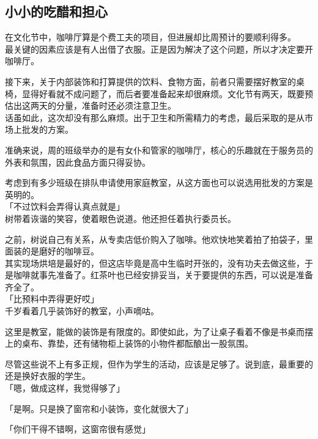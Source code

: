 \subsection{小小的吃醋和担心}

在文化节中，咖啡厅算是个费工夫的项目，但进展却比周预计的要顺利得多。\\

最关键的因素应该是有人出借了衣服。正是因为解决了这个问题，所以才决定要开咖啡厅。

接下来，关于内部装饰和打算提供的饮料、食物方面，前者只需要摆好教室的桌椅，显得好看就不成问题了，而后者要准备起来却很麻烦。文化节有两天，既要预估出这两天的分量，准备时还必须注意卫生。\\

话虽如此，这次却没有那么麻烦。出于卫生和所需精力的考虑，最后采取的是从市场上批发的方案。

准确来说，周的班级举办的是有女仆和管家的咖啡厅，核心的乐趣就在于服务员的外表和氛围，因此食品方面只得妥协。

考虑到有多少班级在排队申请使用家庭教室，从这方面也可以说选用批发的方案是英明的。\\

「不过饮料会弄得认真点就是」\\

树带着诙谐的笑容，使着眼色说道。他还担任着执行委员长。

之前，树说自己有关系，从专卖店低价购入了咖啡。他欢快地笑着拍了拍袋子，里面装的是磨好的咖啡豆。\\

其实现场烘培是最好的，但这店毕竟是高中生临时开张的，没有功夫去做这些，于是咖啡就事先准备了。红茶叶也已经安排妥当，关于要提供的东西，可以说是准备齐全了。\\

「比预料中弄得更好哎」\\

千岁看着几乎装饰好的教室，小声嘀咕。

这里是教室，能做的装饰是有限度的。即使如此，为了让桌子看着不像是书桌而摆上的桌布、靠垫，还有储物柜上装饰的小物件都酝酿出一股氛围。

尽管这些说不上有多正规，但作为学生的活动，应该是足够了。说到底，最重要的还是换好衣服的学生。\\

「嗯，做成这样，我觉得够了」

「是啊。只是换了窗帘和小装饰，变化就很大了」

「你们干得不错啊，这窗帘很有感觉」\\

